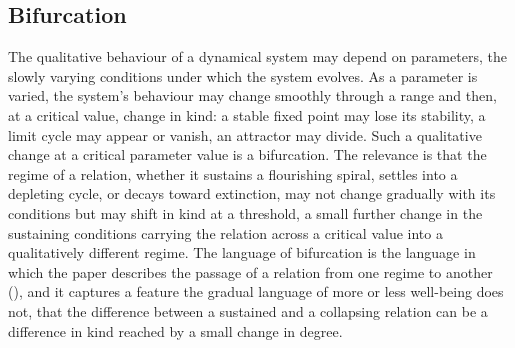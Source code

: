 \subsection{Bifurcation}
\label{p11:sec:dyn-bifurcation}

The qualitative behaviour of a dynamical system may depend on parameters, the slowly varying conditions under which the system evolves. As a parameter is varied, the system's behaviour may change smoothly through a range and then, at a critical value, change in kind: a stable fixed point may lose its stability, a limit cycle may appear or vanish, an attractor may divide. Such a qualitative change at a critical parameter value is a bifurcation. The relevance is that the regime of a relation, whether it sustains a flourishing spiral, settles into a depleting cycle, or decays toward extinction, may not change gradually with its conditions but may shift in kind at a threshold, a small further change in the sustaining conditions carrying the relation across a critical value into a qualitatively different regime. The language of bifurcation is the language in which the paper describes the passage of a relation from one regime to another (), and it captures a feature the gradual language of more or less well-being does not, that the difference between a sustained and a collapsing relation can be a difference in kind reached by a small change in degree.
